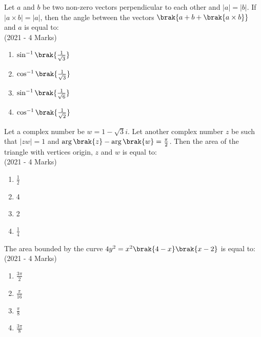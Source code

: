     \item{
        	Let $a$ and $b$ be two non-zero vectors perpendicular to each other and $|a| = |b|$. If $|a \times b| = |a|$, then the angle between the vectors $\brak{a + b + \brak{a \times b}}$ and $a$ is equal to:\\
             \text{   }\hfill
                {(2021 - 4 Marks)}
				\begin{multicols}{4}
	                \begin{enumerate}
	                   	\item $\sin^{-1}\brak{\frac{1}{\sqrt{3}}}$
	                   	\item $\cos^{-1}\brak{\frac{1}{\sqrt{3}}}$
	                   	\item $\sin^{-1}\brak{\frac{1}{\sqrt{6}}}$
	                   	\item $\cos^{-1}\brak{\frac{1}{\sqrt{2}}}$
	                \end{enumerate}
				\end{multicols}
        
        }
    \item{
	
			Let a complex number be $w = 1 - \sqrt{3}i$. Let another complex number $z$ be such that $|zw| = 1$ and $\arg\brak{z} - \arg\brak{w} = \frac{\pi}{2}$. Then the area of the triangle with vertices origin, $z$ and $w$ is equal to:\\
			\text{   }\hfill
			{(2021 - 4 Marks)}
			\begin{multicols}{4}
				\begin{enumerate}
						\item $\frac{1}{2}$
						\item 4
						\item 2
						\item $\frac{1}{4}$
				\end{enumerate}
			\end{multicols}
			
		}
    \item{
	
			The area bounded by the curve $4y^2 = x^2 \brak{4 - x}\brak{x - 2}$ is equal to:\\
			\text{   }\hfill
			{(2021 - 4 Marks)}
			\begin{multicols}{4}
				\begin{enumerate}
					\item $\frac{3\pi}{2}$
					\item $\frac{\pi}{16}$
					\item $\frac{\pi}{8}$
					\item $\frac{3\pi}{8}$
				\end{enumerate}
			\end{multicols}
			
		}
